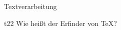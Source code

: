 \documentclass[grundschule,ka]{teacher}
\begin{document}
\begin{aufgabe}{Textverarbeitung}
   \begin{teilaufgabe}{t}{2}{2}
      Wie heißt der Erfinder von \TeX?
   \end{teilaufgabe}
   \begin{loesung}
   \end{loesung}
\end{aufgabe}
\end{document}
